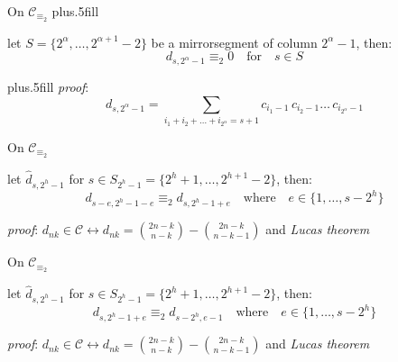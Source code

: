 \documentclass[10pt,serif, professionalfont]{beamer}
\begin{document}
\begin{frame}{On $\mathcal{C}_{\equiv_{2}}$}
      \vskip-15pt plus.5fill
    \begin{theorem}
        let  $S=\lbrace2^{\alpha},\ldots,2^{\alpha+1}-2\rbrace$ be a 
        \flqq mirror\frqq segment of column $2^{\alpha}-1$, then:
        \begin{displaymath} 
            d_{s,2^{\alpha}-1}\equiv_{2}0\quad\text{for}\quad s\in S
        \end{displaymath} 
    \end{theorem}
      \vskip-10pt plus.5fill
    \emph{proof}: 
        \begin{displaymath} 
            d_{s, 2^{\alpha}-1} = \sum_{i_{1}+i_{2}+\ldots+i_{2^{\alpha}}=s+1}
                {c_{i_{1}-1}\,c_{i_{2}-1}\ldots\,c_{i_{2^{\alpha}}-1}}
        \end{displaymath} 
    
    
        
\end{frame}

\begin{frame}{On $\mathcal{C}_{\equiv_{2}}$}
    \begin{theorem}
    let $\hat{d}_{s,2^{h}-1}$ for $s\in S_{2^{h}-1}=\lbrace 2^{h}+1,\ldots,2^{h+1}-2 \rbrace$, then:
    \begin{displaymath}
        d_{s-e,2^{h}-1-e} \equiv_{2} d_{s,2^{h}-1+e}\quad\text{where}\quad
            e\in\lbrace1,\ldots,s-2^{h}\rbrace
    \end{displaymath}
    \end{theorem}
    \emph{proof}: $ d_{nk}\in\mathcal{C}\leftrightarrow 
        d_{nk}={{2n-k}\choose{n-k}} - {{2n-k}\choose{n-k-1}}$ and \emph{Lucas theorem}

    
        
\end{frame}

\begin{frame}{On $\mathcal{C}_{\equiv_{2}}$}
    \begin{theorem}
    let $\hat{d}_{s,2^{h}-1}$ for $s\in S_{2^{h}-1}=\lbrace 2^{h}+1,\ldots,2^{h+1}-2 \rbrace$, then:
    \begin{displaymath}
        d_{s,2^{h}-1+e} \equiv_{2} d_{s-2^{h},e-1}\quad\text{where}\quad e\in\lbrace1,\ldots,s-2^{h}\rbrace
    \end{displaymath}
    \end{theorem}
    \emph{proof}: $ d_{nk}\in\mathcal{C}\leftrightarrow 
        d_{nk}={{2n-k}\choose{n-k}} - {{2n-k}\choose{n-k-1}}$ and \emph{Lucas theorem}

    
        
\end{frame}
\end{document}
